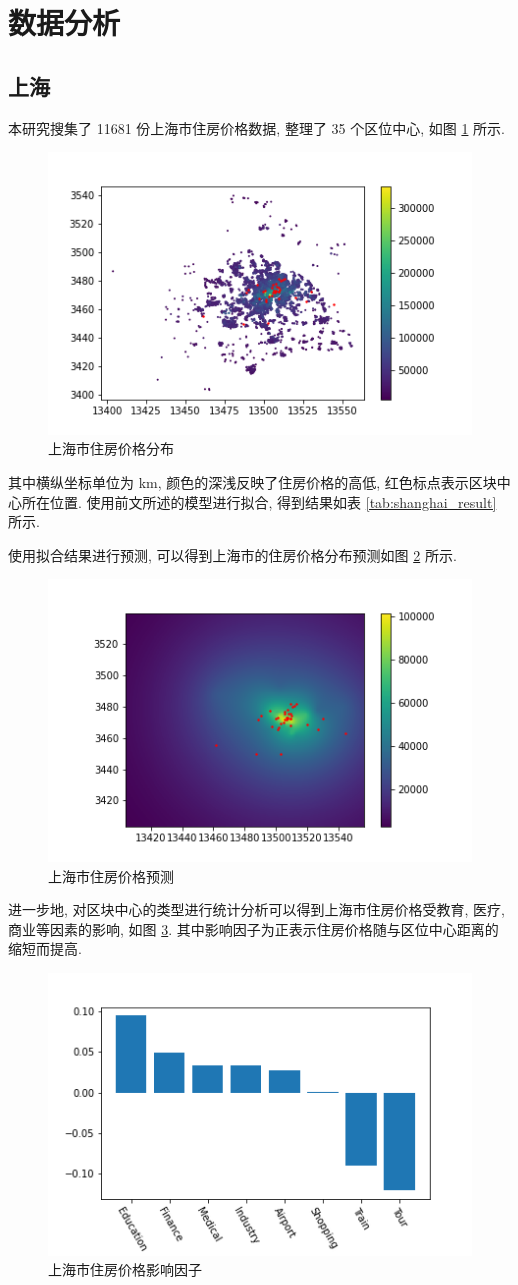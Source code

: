 \section{数据分析}
\subsection{上海}

本研究搜集了 11681 份上海市住房价格数据, 整理了 35 个区位中心, 如图 \ref{fig:shanghai} 所示.

\begin{figure}[htbp]
  \centering
  \includegraphics[width=.5\linewidth]{shanghai/shanghai.png}
  \caption{上海市住房价格分布} \label{fig:shanghai}
\end{figure}

其中横纵坐标单位为 \si{\kilo\metre}, 颜色的深浅反映了住房价格的高低, 红色标点表示区块中心所在位置.
使用前文所述的模型进行拟合, 得到结果如表 \ref{tab:shanghai_result} 所示.

使用拟合结果进行预测, 可以得到上海市的住房价格分布预测如图 \ref{fig:shanghai_predict} 所示.

\begin{figure}[htbp]
  \centering
  \includegraphics[width=.5\linewidth]{shanghai/shanghai_predict.png}
  \caption{上海市住房价格预测}
  \label{fig:shanghai_predict}
\end{figure}

进一步地, 对区块中心的类型进行统计分析可以得到上海市住房价格受教育, 医疗, 商业等因素的影响, 如图 \ref{fig:shanghai_impact}.
其中影响因子为正表示住房价格随与区位中心距离的缩短而提高.

\begin{figure}[htbp]
  \centering
  \includegraphics[width=.5\linewidth]{shanghai/shanghai_impact.png}
  \caption{上海市住房价格影响因子}
  \label{fig:shanghai_impact}
\end{figure}
